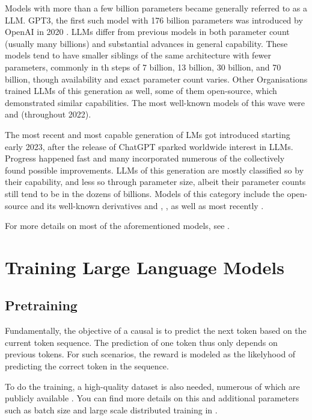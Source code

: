 Models with more than a few billion parameters became generally referred to as a \acrlong{LLM}. \gls{GPT3}, the first such model with 176 billion parameters was introduced by \gls{OpenAI} in 2020 \cite{brown_language_2020}.
\glspl{LLM} differ from previous models in both parameter count (usually many billions) and substantial advances in general capability.
These models tend to have smaller siblings of the same architecture with fewer parameters, commonly in th steps of 7 billion, 13 billion, 30 billion, and 70 billion, though availability and exact parameter count varies.
Other Organisations trained \glspl{LLM} of this generation as well, some of them open-source, which demonstrated similar capabilities.
The most well-known models of this wave were  and  (throughout 2022).

The most recent and most capable generation of \glspl{LM} got introduced starting early 2023, after the release of \gls{ChatGPT} sparked worldwide interest in \glspl{LLM}. Progress happened fast and many incorporated numerous of the collectively found possible improvements. \glspl{LLM} of this generation are mostly classified so by their capability, and less so through parameter size, albeit their parameter counts still tend to be in the dozens of billions. Models of this category include the open-source  and its well-known derivatives  and , , as well as most recently .

For more details on most of the aforementioned models, see .


\section{Training Large Language Models}\label{sec:training}


\subsection{Pretraining}\label{sub:pretraining}
Fundamentally, the objective of a \gls{causal} is to predict the next token based on the current token sequence.
The prediction of one token thus only depends on previous tokens.
For such scenarios, the reward is modeled as the likelyhood of predicting the correct token in the sequence.

To do the training, a high-quality dataset is also needed, numerous of which are publicly available \cite{redpajamadata_2023}.
You can find more details on this and additional parameters such as batch size and large scale distributed training in \cite{tirumala_d4_2023}.

